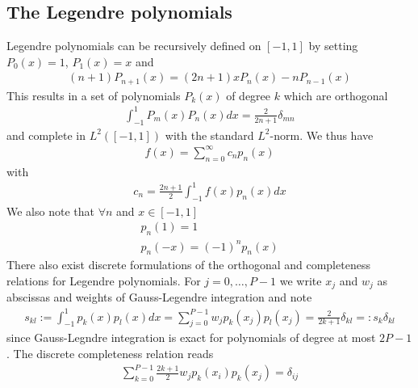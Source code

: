 \documentclass[a4paper,12pt]{scrartcl}
\begin{document}
\subsection{ The Legendre polynomials}
Legendre polynomials can be recursively defined on $[-1,1]$ by setting
$P_0(x) = 1$, $P_1(x) = x$ and
\begin{align}
    (n+1)P_{n+1}(x) = (2n+1)xP_n(x) - nP_{n-1}(x)
    \label{eq:recursion}
\end{align}
This results in a set of polynomials $P_k(x)$ of degree $k$ which are orthogonal
\begin{align}
    \int_{-1}^{1} P_m(x)P_n(x) dx = \frac{2}{2n+1}\delta_{mn} 
    \label{eq:orthogonal}
\end{align}
and complete in $L^2([-1,1])$ with the standard $L^2$-norm. We thus have
\begin{align}
    f(x) = \sum_{n=0}^\infty c_n p_n(x)
    \label{eq:expansion}
\end{align} with
\begin{align}
    c_n = \frac{2n+1}{2}\int_{-1}^{1} f(x)p_n(x)dx
    \label{eq:coefficient}
\end{align}
We also note that $\forall n$ and $x\in[-1,1]$
\begin{subequations}
\begin{align}
    p_n(1) = 1 \\
    p_n(-x) = (-1)^np_n(x)
\end{align}
\label{eq:boundaries}
\end{subequations}
There also exist discrete formulations
of the orthogonal and completeness relations for Legendre polynomials.
For $j=0,\dots,P-1$ we write $x_j$ and $w_j$ as abscissas and weights of 
Gauss-Legendre integration and note
\begin{align}
    s_{kl} := \int_{-1}^1 p_k(x)p_l(x) dx = \sum_{j=0}^{P-1} w_jp_k (x_j)p_l(x_j) = \frac{2}{2k+1}\delta_{kl} =: s_k \delta_{kl}
    \label{}
\end{align}
since Gauss-Legndre integration is exact for polynomials of degree at most $2P-1$.
The discrete completeness relation reads
\begin{align}
    \sum_{k=0}^{P-1} \frac{2k+1}{2}w_j p_k(x_i)p_k(x_j) = \delta_{ij} 
    \label{}
\end{align}
\end{document}

